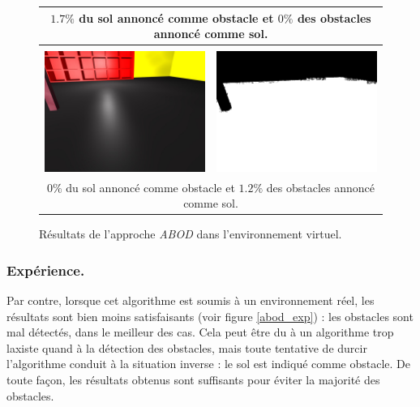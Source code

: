\documentclass{article}
\begin{document}
\begin{figure}
\begin{center}
\begin{tabular}{|cc|}
            \multicolumn{2}{|c|}{$1.7\%$ du sol annoncé comme obstacle et $0\%$ des obstacles annoncé comme sol.} \\
            \hline & \\
            \includegraphics[width=0.4\linewidth]{rcs/abodv2s.png} & \includegraphics[width=0.4\linewidth]{rcs/abodv2r.png} \\
            \multicolumn{2}{|c|}{$0\%$ du sol annoncé comme obstacle et $1.2\%$ des obstacles annoncé comme sol.} \\
            \hline
        \end{tabular}
    \end{center}
    \caption{Résultats de l'approche \emph{ABOD} dans l'environnement virtuel.}
    \label{abod_simu}
\end{figure}

\subsubsection{Expérience.}
Par contre, lorsque cet algorithme est soumis à un environnement réel, les résultats sont bien moins satisfaisants (voir figure \ref{abod_exp}) : les obstacles sont mal détectés, dans le meilleur des cas. Cela peut être du à un algorithme trop laxiste quand à la détection des obstacles, mais toute tentative de durcir l'algorithme conduit à la situation inverse : le sol est indiqué comme obstacle. De toute façon, les résultats obtenus sont suffisants pour éviter la majorité des obstacles.
\end{document}
